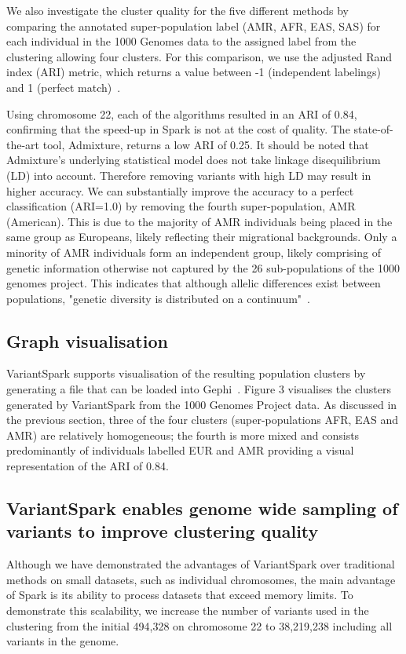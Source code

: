 \documentclass{bmcart}
\newcommand{\variantSpark}{{\sc VariantSpark}}
\newcommand{\ARI}{adjusted Rand index}
\begin{document}
We also investigate the cluster quality for the five different methods by comparing the annotated super-population label (AMR, AFR, EAS, SAS) for each individual in the 1000 Genomes data to the assigned label from the clustering allowing four clusters. 
For this comparison, we use the \ARI{} (ARI) metric, which returns a value between -1 (independent labelings) and 1 (perfect match)~\cite{Hubert1985}.

Using chromosome 22, each of the algorithms resulted in an ARI of 0.84, confirming that the speed-up in {\sc Spark} is not at the cost of quality.
The state-of-the-art tool, {\sc Admixture}, returns a low ARI of 0.25. It should be noted that {\sc Admixture}'s underlying statistical model does not take linkage disequilibrium (LD) into account. 
Therefore removing variants with high LD may result in higher accuracy. 
We can substantially improve the accuracy to a perfect classification (ARI=1.0) by removing the fourth super-population, AMR (American). 
This is due to the majority of AMR individuals being placed in the same group as Europeans, likely reflecting their migrational backgrounds. 
Only a minority of AMR individuals form an independent group, likely comprising of genetic information otherwise not captured by the 26 sub-populations of the 1000 genomes project.
This indicates that although allelic differences exist between populations, "genetic diversity is distributed on a continuum"~\cite{Pugach2015}.

\subsection*{Graph visualisation}
\variantSpark{} supports visualisation of the resulting population clusters by generating a file that can be loaded into {\sc Gephi}~\cite{ICWSM09154}.
Figure 3 visualises the clusters generated by \variantSpark{} from the 1000 Genomes Project data. 
As discussed in the previous section, three of the four clusters (super-populations AFR, EAS and AMR) are relatively homogeneous; the fourth is more mixed and 
consists predominantly of individuals labelled EUR and AMR providing a visual representation of the ARI of 0.84.


\subsection*{\variantSpark{} enables genome wide sampling of variants to improve clustering quality}
Although we have demonstrated the advantages of \variantSpark{} over traditional methods on small datasets, such as individual chromosomes, the main advantage of {\sc Spark} is its ability to process datasets that exceed memory limits.
To demonstrate this scalability, we increase the number of variants used in the clustering from the initial 494,328 on chromosome 22 to 38,219,238 including all variants in the genome.
\end{document}
